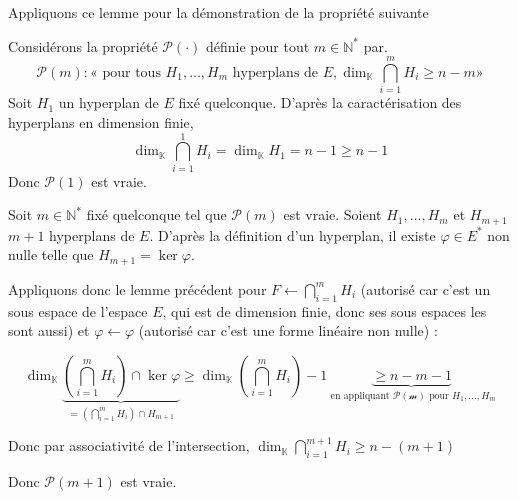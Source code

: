 \documentclass{article}
\begin{document}
\begin{question_kholle}
Appliquons ce lemme pour la démonstration de la propriété suivante


Considérons la propriété $\mathcal{P}(\cdot)$ définie pour tout $m \in \mathbb{N}^{*}$ par.
$$
\mathcal{P}(m) : « \text{ pour tous } H_{1},\dots, H_{m} \text{ hyperplans de } E, \dim_{\mathbb{K}} \bigcap_{i=1}^{m}H_{i} \geqslant n-m »
$$
Soit $H_{1}$ un hyperplan de $E$ fixé quelconque. D'après la caractérisation des hyperplans en dimension finie, 
$$
\dim_{\mathbb{K}} \bigcap_{i=1}^{1}H_{i} = \dim_{\mathbb{K}}H_{1}= n-1 \geqslant n-1
$$
Donc $\mathcal{P}(1)$ est vraie.

Soit $m \in \mathbb{N}^{*}$ fixé quelconque tel que $\mathcal{P}(m)$ est vraie.
Soient $H_{1},\dots,H_{m}$ et $H_{m+1}$ $m+1$ hyperplans de $E$.
D'après la définition d'un hyperplan, il existe $\varphi \in E ^{*}$ non nulle telle que $H_{m+1} = \ker \varphi$.

Appliquons donc le lemme précédent pour $F \leftarrow \bigcap_{i=1}^{m}H_{i}$ (autorisé car c'est un sous espace de l'espace $E$, qui est de dimension finie, donc ses sous espaces les sont aussi) et $\varphi \leftarrow \varphi$ (autorisé car c'est une forme linéaire non nulle) :

$$
\dim_{\mathbb{K}} \underbrace{ \left( \bigcap_{i=1}^{m}H_{i} \right) \cap \ker \varphi  }_{ =\left( \bigcap_{i=1}^{m}H_{i}  \right)\cap H_{m+1} }\geqslant \dim_{\mathbb{K}} \left( \bigcap_{i=1}^{m}H_{i} \right) - 1 \underbrace{ \geqslant n - m - 1 }_{ \text{ en appliquant }\mathcal{P(m)} \text{ pour } H_{1},\dots,H_{m} }
$$

Donc par associativité de l'intersection, $\dim_{\mathbb{K}} \bigcap_{i=1}^{m+1}H_{i} \geqslant n - (m+1)$

Donc $\mathcal{P}(m+1)$ est vraie.

\end{question_kholle}
\end{document}
